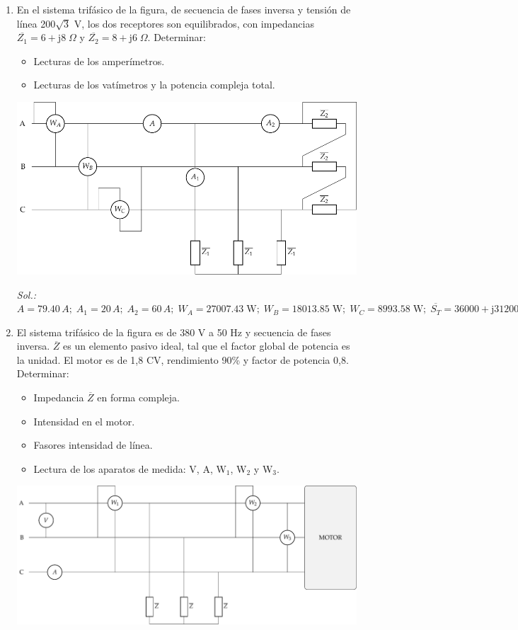 \begin{enumerate}
\item En el sistema trifásico de la figura, de secuencia de fases
  inversa y tensión de línea 200$\sqrt{3}$ V, los dos receptores son
  equilibrados, con impedancias
  $\overline{Z_1} = 6+\mathrm{j}8\;\Omega$ y
  $\overline{Z_2} = 8+\mathrm{j}6\;\Omega$. Determinar:
  \begin{itemize}
  \item Lecturas de los amperímetros.
  \item Lecturas de los vatímetros y la potencia compleja total.
  \end{itemize}
  \begin{center}
    \includegraphics[width=.8\linewidth]{../figs/ej5_BT3.pdf}
  \end{center}

  \emph{Sol.:
    $A=79.40\,A;\;A_1=20\,A;\;A_2=60\,A;\; W_A={27007.43\;\text{W}};\;
    W_B={18013.85\;\text{W}};\;W_C={8993.58\;\text{W}};\;
    \overline{S_T}=36000+\mathrm{j}31200\,VA $}

\item El sistema trifásico de la figura es de 380 V a 50 Hz y
  secuencia de fases inversa. $\overline{Z}$ es un elemento pasivo
  ideal, tal que el factor global de potencia es la unidad. El motor
  es de 1,8 CV, rendimiento 90\% y factor de potencia 0,8. Determinar:
  \begin{itemize}
  \item Impedancia $\overline{Z}$ en forma compleja.
  \item Intensidad en el motor.
  \item Fasores intensidad de línea.
  \item Lectura de los aparatos de medida: V, A, W$_1$, W$_2$ y W$_3$.
  \end{itemize}
  \begin{center}
    \includegraphics[width=\linewidth]{../figs/ej7_BT3.pdf}
  \end{center}


\end{enumerate}
